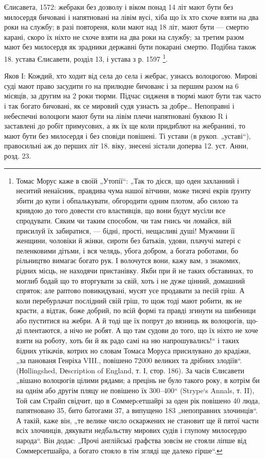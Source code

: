 Єлисавета, 1572: жебраки без дозволу і віком понад 14 літ мают бути без
милосердя бичовані і напятновані на лівім вусі, хіба що їх хто схоче взяти на
два роки на службу; в разі повтореня, коли мают над 18 літ, мают бути — смертю
карані, скоро їх ніхто не схоче взяти на два роки на службу; за третим разом
мают без милосердя як зрадники державні бути покарані смертю. Подібна також 18.
устава Єлисавети, розділ 13, і устава з р. 1597 \footnote{
Томас Морус каже в своїй „Утопії“: „Так то дієся, що оден захланний і неситий
ненаїсник, правдива чума нашої вітчини, може тисячі екрів ґрунту збити до купи
і обпалькувати, обгородити одним плотом, або силою та кривдою до того довести
єго властивців, що вони будут мусіли все спродувати. Сяким чи таким способом,
чи там гнись чи ломайся, вій присилуй їх забиратися, — бідні, прості, нещасливі
душі! Мужчини її женщини, чоловіки й жінки, сироти без батьків, удови, плачучі
матері с пеленковими дітьми, і вся челядь, убога добром, а богата
роботами, бо рільництво вимагає богато рук. І волочутся вони, кажу вам,
з знакомих, рідних місць, не находячи пристанівку. Якби при й не таких
обставинах, то моглиб бодай що то вторгувати за свій, хоть і не дуже
цінний, домашний спряток; але раптово повикидувані, мусят усе продавати
за песій гріш. А коли перебурлачат послідний свій гріш, то щож
тоді мают робити, як не красти, а відтак, боже добрий, по всій формі та
правді згинути на шибеници або пуститися на жебри. А й тоді ще їх
попрут до вязниць як волоцюгів, що-ді плентаются, а нічо не робят.
А що там судови до того, що їх ніхто не хоче взяти на роботу, хоть би
й як радо самі на ню напрошувались!“ і таких бідних утікачів, котрих
но словам Томаса Моруса присилувано до крадіжи, „за панованя Генріха
VIII., повішено 72000 великих та дрібних злодіїв“. (Ноllingshed, Dеscription
of England, т. І, стор. 186). За часів Єлисавети „вішано волоцюгів
цілими рядами; а прецінь не було такого року, в котрім би на
однім або другім пляцу не повішено їх 300--400“ (Strype`s Annals, т. II),
Той сам Страйп свідчит, що в Соммерcетшайрі за оден рік повішено 40
люда, папятновано 35, бито батогами 37, а випущено 183 „непоправних
злочинців“. А такій, каже він, „те велике число оскаржених не становит
ще й пятої части всіх злочинців, дякувати недбальству мирових судів
і глупому милосердю народа“. Він додає: „Прочі англійські ґрафства
зовсім не стояли ліпше від Соммерсетшайра, а богато стояло в тім згляді
ще далеко гірше“.
}.

Яков І: Кождий, хто ходит від села до села і жебрає,
узнаєсь волоцюгою. Мирові суді мают право засудити го на
прилюдне бичованє і за першим разом на 6 місяців, за
другим на 2 роки тюрми. Підчас сидженя в тюрмі мают
бути так часто і так богато бичовані, як се мировий судя
узнасть за добре\dots{} Непоправні і небеспечні волоцюги мают
бути на лівім плечи напятновані буквою R і заставлені до
робіт примусових, а як їх ще коли придиблют на жебранині,
то мают бути без милосердя і без сповіди повішені. Ті устави
(в рукоп. „уставі“), правосильні аж до перших літ 18. віку,
знесені зістали доперва 12. уст. Анни, розд. 23.

